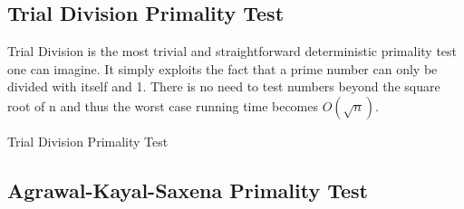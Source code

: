\documentclass[compressed,final,notitlepage,narroweqnarray,inline,twoside,]{ieee}
\begin{document}
\subsection{Trial Division Primality Test}
Trial Division is the most trivial and straightforward deterministic primality test one can imagine. It simply exploits the fact that a prime number can only be divided with itself and 1. There is no need to test numbers beyond the square root of n and thus the worst case running time becomes $O(\sqrt{n})$.
\begin{algorithm}[ht]
 \caption{Trial Division Primality Test}

 {
	{
		\;
	}
 }
 \;
\end{algorithm}
\subsection{Agrawal-Kayal-Saxena Primality Test}
\end{document}
